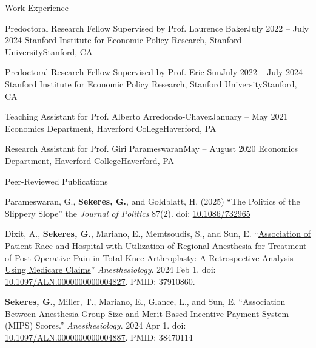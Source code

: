 \documentclass{resume}
\begin{document}
\begin{rSection}{Work Experience}

\begin{rSubsection}{Predoctoral Research Fellow Supervised by Prof. Laurence Baker}{July 2022 -- July 2024}{  Stanford Institute for Economic Policy Research, Stanford University}{Stanford, CA}
\item[]
\vspace{-1cm}
\end{rSubsection}
\begin{rSubsection}{Predoctoral Research Fellow Supervised by Prof. Eric Sun}{July 2022 -- July 2024}{  Stanford Institute for Economic Policy Research, Stanford University}{Stanford, CA}
\item[]
\vspace{-1cm}
\end{rSubsection}

\begin{rSubsection}{Teaching Assistant for Prof. Alberto Arredondo-Chavez}{January -- May 2021}{  Economics Department, Haverford College}{Haverford, PA}
\item[]
\vspace{-1cm}
\end{rSubsection}

\begin{rSubsection}{Research Assistant for Prof. Giri Parameswaran}{May -- August 2020}{  Economics Department, Haverford College}{Haverford, PA}
\item[]
\vspace{-1cm}
\end{rSubsection}
 \end{rSection}
\begin{rSection}{Peer-Reviewed Publications}
\vspace{-0.5cm}
	\item Parameswaran, G., \textbf{Sekeres, G.}, and Goldblatt, H. (2025) ``The Politics of the Slippery Slope'' the \emph{Journal of Politics} 87(2). doi: \href{https://doi.org/10.1086/732965}{10.1086/732965}
    \item Dixit, A., \textbf{Sekeres, G.}, Mariano, E., Memtsoudis, S., and Sun, E. ``\href{https://pubmed.ncbi.nlm.nih.gov/37910860/}{Association of Patient Race and Hospital with Utilization of Regional Anesthesia for Treatment of Post-Operative Pain in Total Knee Arthroplasty: A Retrospective Analysis Using Medicare Claims}'' \emph{Anesthesiology}. 2024 Feb 1. doi: \href{https://doi.org/10.1097/aln.0000000000004827}{10.1097/ALN.0000000000004827}. PMID: 37910860.

    \item \textbf{Sekeres, G.}, Miller, T., Mariano, E., Glance, L., and Sun, E. ``Association Between Anesthesia Group Size and Merit-Based Incentive Payment System (MIPS) Scores.'' \emph{Anesthesiology}. 2024 Apr 1. doi: \href{https://doi.org/10.1097/ALN.0000000000004887}{10.1097/ALN.0000000000004887}. PMID: 38470114
\end{rSection}
\end{document}
